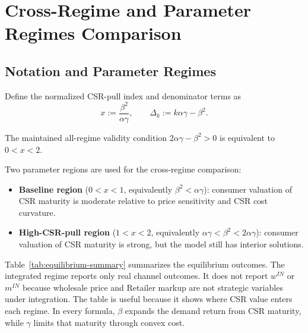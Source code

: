 \section{Cross-Regime and Parameter Regimes Comparison}
\label{sec:cross_regime}

\subsection{Notation and Parameter Regimes}

Define the normalized CSR-pull index and denominator terms as
\[
    x:=\frac{\beta^2}{\alpha\gamma},
    \qquad
    \Delta_k:=k\alpha\gamma-\beta^2.
\]

The maintained all-regime validity condition $2\alpha\gamma-\beta^2>0$ is equivalent to $0<x<2$.

Two parameter regions are used for the cross-regime comparison:
\begin{itemize}
    \item \textbf{Baseline region} ($0<x<1$, equivalently $\beta^2<\alpha\gamma$): consumer valuation of CSR maturity is moderate relative to price sensitivity and CSR cost curvature.
    \item \textbf{High-CSR-pull region} ($1<x<2$, equivalently $\alpha\gamma<\beta^2<2\alpha\gamma$): consumer valuation of CSR maturity is strong, but the model still has interior solutions.
\end{itemize}

Table~\ref{tab:equilibrium-summary} summarizes the equilibrium outcomes. The integrated regime reports only real channel outcomes. It does not report $w^{IN}$ or $m^{IN}$ because wholesale price and Retailer markup are not strategic variables under integration. The table is useful because it shows where CSR value enters each regime. In every formula, $\beta$ expands the demand return from CSR maturity, while $\gamma$ limits that maturity through convex cost.

